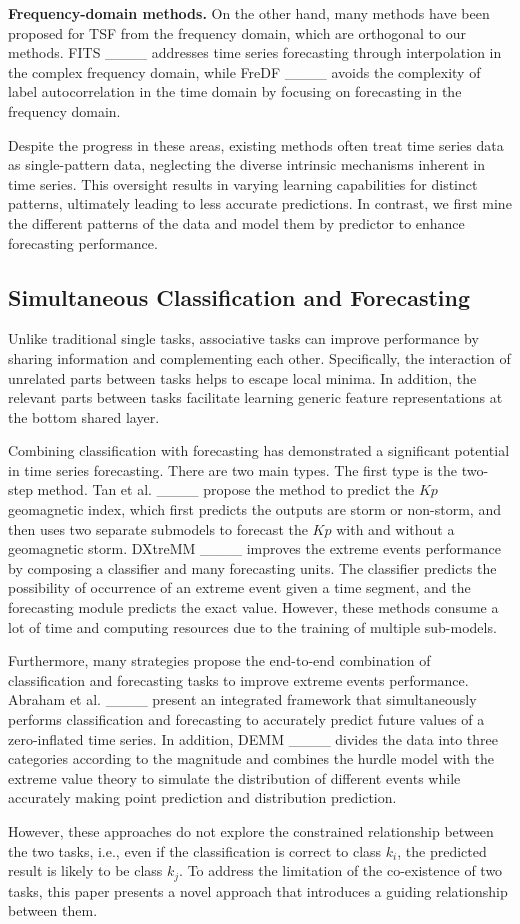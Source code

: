\textbf{Frequency-domain methods.} On the other hand, many methods have been proposed for TSF from the frequency domain, which are orthogonal to our methods. FITS ____ addresses time series forecasting through interpolation in the complex frequency domain, while FreDF ____ avoids the complexity of label autocorrelation in the time domain by focusing on forecasting in the frequency domain.

Despite the progress in these areas, existing methods often treat time series data as single-pattern data, neglecting the diverse intrinsic mechanisms inherent in time series. This oversight results in varying learning capabilities for distinct patterns, ultimately leading to less accurate predictions. In contrast, we first mine the different patterns of the data and model them by predictor to enhance forecasting performance.

\subsection{Simultaneous Classification and Forecasting}
Unlike traditional single tasks, associative tasks can improve performance by sharing information and complementing each other. Specifically, the interaction of unrelated parts between tasks helps to escape local minima. In addition, the relevant parts between tasks facilitate learning generic feature representations at the bottom shared layer.

Combining classification with forecasting has demonstrated a significant potential in time series forecasting.
There are two main types. The first type is the two-step method. Tan et al. ____ propose the method to predict the $Kp$ geomagnetic index, which first predicts the outputs are storm or non-storm, and then uses two separate submodels to forecast the $Kp$ with and without a geomagnetic storm.
DXtreMM ____ improves the extreme events performance by composing a classifier and many forecasting units. The classifier predicts the possibility of occurrence of an extreme event given a time segment, and the forecasting module predicts the exact value.
However, these methods consume a lot of time and computing resources due to the training of multiple sub-models.


Furthermore, many strategies propose the end-to-end combination of classification and forecasting tasks to improve extreme events performance. 
Abraham et al. ____ present an integrated framework that simultaneously performs classification and forecasting to accurately predict future values of a zero-inflated time series.
In addition, DEMM ____ divides the data into three categories according to the magnitude and combines the hurdle model with the extreme value theory to simulate the distribution of different events while accurately making point prediction and distribution prediction.

However, these approaches do not explore the constrained relationship between the two tasks, i.e., even if the classification is correct to class $k_i$, the predicted result is likely to be class $k_j$. To address the limitation of the co-existence of two tasks, this paper presents a novel approach that introduces a guiding relationship between them.\\